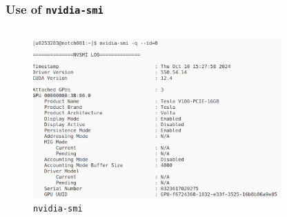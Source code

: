 \begin{frame}
        \frametitle{Use of \texttt{nvidia-smi}}
     \begin{columns}
    \begin{figure}[H]
       \centering
          \includegraphics[width=0.85\textwidth]{./img/nvidia-smi.png}
          \caption{\small{\texttt{nvidia-smi}}}
    \end{figure}
     \end{columns}
\end{frame}



